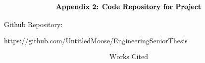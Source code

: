 \documentclass[english,12pt,a4paper,titlepage]{article}
\begin{document}
		\pagebreak
	\[
	\begin{array}{cc}
		\mbox{\bfseries{Appendix 2: Code Repository for Project}}
	\end{array}
	\]
	\begin{center}
		Github Repository:
		\quad
	\end{center}
	\begin{center}
		https://github.com/UntitledMoose/EngineeringSeniorThesis
	\end{center}
	
	\pagebreak
	\[
	\begin{array}{cc}
		\mbox{Works Cited}
	\end{array}
	\]
	\vspace{-1cm}
	\printbibliography
	
\end{document}
